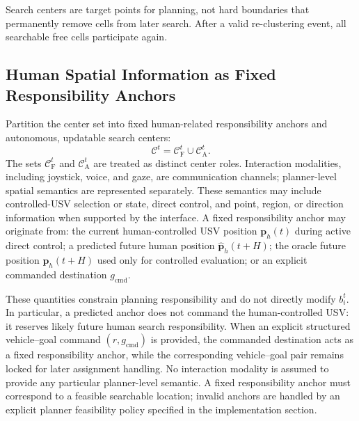 \documentclass[letterpaper, 10pt, conference]{ieeeconf}
\begin{document}
Search centers are target points for planning, not hard boundaries that permanently remove cells from later search. After a valid re-clustering event, all searchable free cells participate again.

\subsection{Human Spatial Information as Fixed Responsibility Anchors}

Partition the center set into fixed human-related responsibility anchors and autonomous, updatable search centers:
\begin{equation}
  \mathcal{C}^t = \mathcal{C}_{\mathrm{F}}^t \cup \mathcal{C}_{\mathrm{A}}^t.
  \label{eq:center_role_partition}
\end{equation}
The sets \(\mathcal{C}_{\mathrm{F}}^t\) and \(\mathcal{C}_{\mathrm{A}}^t\) are treated as distinct center roles. Interaction modalities, including joystick, voice, and gaze, are communication channels; planner-level spatial semantics are represented separately. These semantics may include controlled-USV selection or state, direct control, and point, region, or direction information when supported by the interface. A fixed responsibility anchor may originate from: the current human-controlled USV position \(\mathbf{p}_h(t)\) during active direct control; a predicted future human position \(\hat{\mathbf{p}}_h(t+H)\); the oracle future position \(\mathbf{p}_h(t+H)\) used only for controlled evaluation; or an explicit commanded destination \(g_{\mathrm{cmd}}\).

These quantities constrain planning responsibility and do not directly modify \(b_i^t\). In particular, a predicted anchor does not command the human-controlled USV: it reserves likely future human search responsibility. When an explicit structured vehicle--goal command \((r,g_{\mathrm{cmd}})\) is provided, the commanded destination acts as a fixed responsibility anchor, while the corresponding vehicle--goal pair remains locked for later assignment handling. No interaction modality is assumed to provide any particular planner-level semantic. A fixed responsibility anchor must correspond to a feasible searchable location; invalid anchors are handled by an explicit planner feasibility policy specified in the implementation section.
\end{document}
